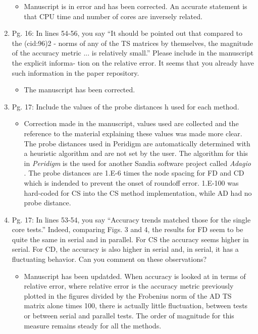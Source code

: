 \documentclass{article}
\begin{document}
\begin{enumerate}
{\color{red}  
\begin{itemize}
     \item
     Manuscript is in error and has been corrected. An accurate statement is that CPU time and number of cores are inversely related.
  \end{itemize}}

  \item
    Pg. 16: In lines 54-56, you say “It should be pointed out that compared to the (cid:96)2 -
    norms of any of the TS matrices by themselves, the magnitude of the accuracy
    metric ... is relatively small.” Please include in the manuscript the explicit informa-
    tion on the relative error. It seems that you already have such information in the
    paper repository.

{\color{red}  
\begin{itemize}
     \item
    The manuscript has been corrected. 
    \end{itemize}}

  \item
    Pg. 17: Include the values of the probe distances h used for each method.

{\color{red}  
\begin{itemize}
     \item
    Correction made in the manuscript, values used are collected and the reference to the material explaining these values was made more clear.
    The probe distances used in Peridigm are automatically determined with a heuristic algorithm and are not set by the user. The algorithm for this in \emph{Peridigm} is the used for another Sandia software project called \emph{Adagio} \cite{ref-Adaggio}. The probe distances are 1.E-6 times the node spacing for FD and CD which is indended to prevent the onset of roundoff error.  1.E-100 was hard-coded for CS into the CS method implementation, while AD had no probe distance.
  \end{itemize}}

  \item
    Pg. 17: In lines 53-54, you say “Accuracy trends matched those for the single core
    tests.” Indeed, comparing Figs. 3 and 4, the results for FD seem to be quite the
    same in serial and in parallel. For CS the accuracy seems higher in serial. For CD,
    the accuracy is also higher in serial and, in serial, it has a ﬂuctuating behavior. Can
    you comment on these observations?

{\color{red}  
\begin{itemize}
     \item
     	Manuscript has been updatded. When accuracy is looked at in terms of relative error, where relative error is the accuracy metric previously plotted in the figures divided by the Frobenius norm of the AD TS matrix alone times 100, there is actually little fluctuation, between tests or between serial and parallel tests. The order of magnitude for this measure remains steady for all the methods.
  \end{itemize}}


\end{enumerate}
\end{document}
